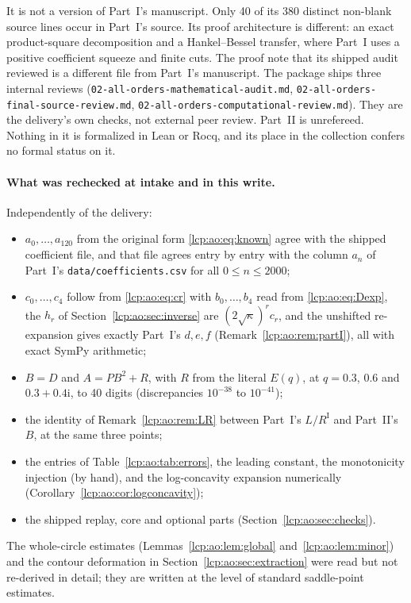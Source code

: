 \documentclass[11pt]{article}
\numberwithin{equation}{section}
\theoremstyle{definition}\newtheorem{definition}[theorem]{Definition}
\theoremstyle{remark}\newtheorem{remark}[theorem]{Remark}
\newcommand{\ii}{\mathrm i}%
\begin{document}
It is not a version of Part~I's manuscript. Only 40 of its 380 distinct
non-blank source lines occur in Part~I's source. Its proof architecture is
different: an exact product-square decomposition and a Hankel--Bessel
transfer, where Part~I uses a positive coefficient squeeze and finite cuts.
The proof note that its shipped audit reviewed is a different file from
Part~I's manuscript. The package ships three internal reviews
(\texttt{02-all-orders-mathematical-audit.md},
\texttt{02-all-orders-final-source-review.md},
\texttt{02-all-orders-computational-review.md}). They are the delivery's
own checks, not external peer review. Part~II is unrefereed. Nothing in
it is formalized in Lean or Rocq, and its place in the collection confers
no formal status on it.

\paragraph{What was rechecked at intake and in this write.} Independently
of the delivery:
\begin{itemize}[leftmargin=*,itemsep=0.15em]
\item $a_0,\ldots,a_{120}$ from the original form \eqref{lcp:ao:eq:known}
 agree with the shipped coefficient file, and that file agrees entry by
 entry with the column $a_n$ of Part~I's \texttt{data/coefficients.csv}
 for all $0\le n\le2000$;
\item $c_0,\ldots,c_4$ follow from \eqref{lcp:ao:eq:cr} with
 $b_0,\ldots,b_4$ read from \eqref{lcp:ao:eq:Dexp}, the $h_r$ of
 Section~\ref{lcp:ao:sec:inverse} are $(2\sqrt\kappa)^rc_r$, and the
 unshifted re-expansion gives exactly Part~I's $d,e,f$
 (Remark~\ref{lcp:ao:rem:partI}), all with exact SymPy arithmetic;
\item $B=D$ and $A=PB^2+R$, with $R$ from the literal $E(q)$, at
 $q=0.3$, $0.6$ and $0.3+0.4\ii$, to 40 digits (discrepancies
 $10^{-38}$ to $10^{-41}$);
\item the identity of Remark~\ref{lcp:ao:rem:LR} between Part~I's
 $L/R^{\mathrm I}$ and Part~II's $B$, at the same three points;
\item the entries of Table~\ref{lcp:ao:tab:errors}, the leading constant,
 the monotonicity injection (by hand), and the log-concavity expansion
 numerically (Corollary~\ref{lcp:ao:cor:logconcavity});
\item the shipped replay, core and optional parts
 (Section~\ref{lcp:ao:sec:checks}).
\end{itemize}
The whole-circle estimates (Lemmas~\ref{lcp:ao:lem:global}
and~\ref{lcp:ao:lem:minor}) and the contour deformation in
Section~\ref{lcp:ao:sec:extraction} were read but not re-derived in
detail; they are written at the level of standard saddle-point estimates.
\end{document}
